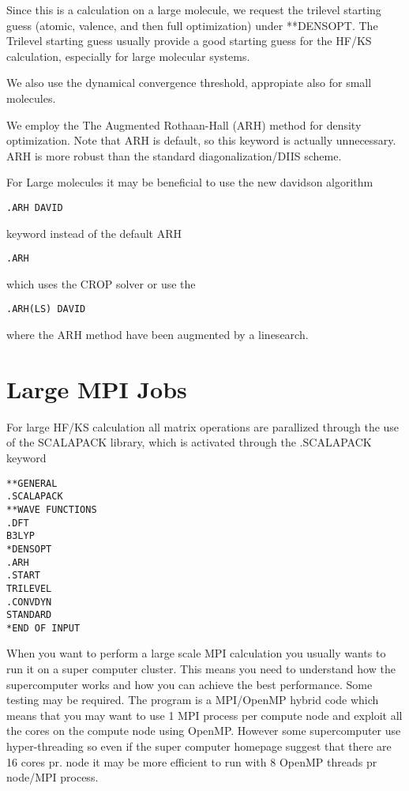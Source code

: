 Since this is a calculation on a large molecule, we request the trilevel starting 
guess\cite{trilevel1, trilevel2} (atomic, valence, and then full optimization) under **DENSOPT. 
The Trilevel starting guess usually provide a good starting guess 
for the HF/KS calculation, especially for large molecular systems. 
 
We also use the dynamical convergence threshold, appropiate also for small molecules. 

We employ the The Augmented Rothaan-Hall (ARH) method for density optimization. 
Note that ARH is default, so this keyword is actually unnecessary.
ARH is more robust than the standard diagonalization/DIIS scheme.

For Large molecules it may be beneficial to use the new davidson algorithm 

\begin{verbatim}
.ARH DAVID
\end{verbatim}

keyword instead of the default ARH

\begin{verbatim}
.ARH
\end{verbatim}
which uses the CROP solver or use the 
\begin{verbatim}
.ARH(LS) DAVID
\end{verbatim}
where the ARH method have been augmented by a linesearch. 

\section{Large MPI Jobs}

For large HF/KS calculation all matrix operations are parallized through the use of the SCALAPACK library, which is activated through the .SCALAPACK keyword 

\begin{verbatim}
**GENERAL
.SCALAPACK
**WAVE FUNCTIONS
.DFT
B3LYP
*DENSOPT
.ARH
.START
TRILEVEL
.CONVDYN
STANDARD
*END OF INPUT
\end{verbatim}

When you want to perform a large scale MPI calculation you usually wants to run it on a super computer cluster. This means you need to understand how the supercomputer works and how you can achieve the best performance. Some testing may be required. The {\lsdalton} program is a MPI/OpenMP hybrid code which means that you may want to use 1 MPI process per compute node and exploit all the cores on the compute node using OpenMP. However some supercomputer use hyper-threading so even if the super computer homepage suggest that there are 16 cores pr. node  it may be more efficient to run with 8 OpenMP threads pr node/MPI process.    

